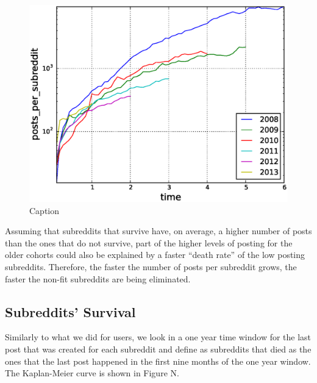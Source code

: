 \begin{figure}[!tb]
\centering
\includegraphics[scale=0.4]{./images/posts_per_subreddit_cohorts.eps}
\caption{Caption}
\label{fig:posts_per_subreddit_cohorts}
\end{figure}

Assuming that subreddits that survive have, on average, a higher number of posts than the ones that do not survive, part of the higher levels of posting for the older cohorts could also be explained by a faster ``death rate'' of the low posting subreddits. Therefore, the faster the number of posts per subreddit grows, the faster the non-fit subreddits are being eliminated.

\subsection{Subreddits' Survival}

Similarly to what we did for users, we look in a one year time window for the last post that was created for each subreddit and define as subreddits that died as the ones that the last post happened in the first nine months of the one year window. The Kaplan-Meier curve is shown in Figure N.

